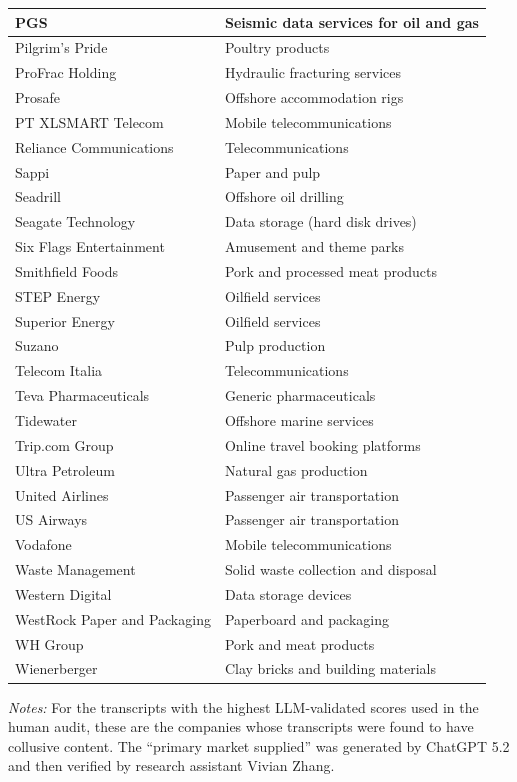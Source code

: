 \begin{longtable}{|l|l|}
    \hline
    PGS & Seismic data services for oil and gas \\
    \hline
    Pilgrim’s Pride & Poultry products \\
    \hline
    ProFrac Holding & Hydraulic fracturing services \\
    \hline
    Prosafe & Offshore accommodation rigs \\
    \hline
    PT XLSMART Telecom & Mobile telecommunications \\
    \hline
    Reliance Communications & Telecommunications \\
    \hline
    Sappi & Paper and pulp \\
    \hline
    Seadrill & Offshore oil drilling \\
    \hline
    Seagate Technology & Data storage (hard disk drives) \\
    \hline
    Six Flags Entertainment & Amusement and theme parks \\
    \hline
    Smithfield Foods & Pork and processed meat products \\
    \hline
    STEP Energy & Oilfield services \\
    \hline
    Superior Energy & Oilfield services \\
    \hline
    Suzano & Pulp production \\
    \hline
    Telecom Italia & Telecommunications \\
    \hline
    Teva Pharmaceuticals & Generic pharmaceuticals \\
    \hline
    Tidewater & Offshore marine services \\
    \hline
    Trip.com Group & Online travel booking platforms \\
    \hline
    Ultra Petroleum & Natural gas production \\
    \hline
    United Airlines & Passenger air transportation \\
    \hline
    US Airways & Passenger air transportation \\
    \hline
    Vodafone & Mobile telecommunications \\
    \hline
    Waste Management & Solid waste collection and disposal \\
    \hline
    Western Digital & Data storage devices \\
    \hline
    WestRock Paper and Packaging & Paperboard and packaging \\
    \hline
    WH Group & Pork and meat products \\
    \hline
    Wienerberger & Clay bricks and building materials \\
    \hline
\end{longtable}
\begin{minipage}{\textwidth}
\vspace{0.5em}
\footnotesize
\textit{Notes:} For the  transcripts with the highest LLM-validated scores used in the human audit, these are the companies whose transcripts were found to have collusive content. The ``primary market supplied'' was generated by ChatGPT 5.2 and then verified by research assistant Vivian Zhang.
\end{minipage}
